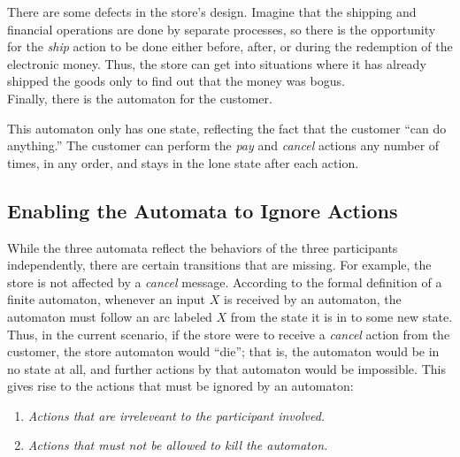 \documentclass[]{article}
\begin{document}
    There are some defects in the store's design. Imagine that the shipping
    and financial operations are done by separate processes, so there is the
    opportunity for the \emph{ship} action to be done either before, after, or
    during the redemption of the electronic money. Thus, the store can get
    into situations where it has already shipped the goods only to find out
    that the money was bogus. \\
    \indent Finally, there is the automaton for the customer.


    This automaton only has one state, reflecting the fact that the customer
    ``can do anything.'' The customer can perform the \emph{pay} and
    \emph{cancel} actions any number of times, in any order, and stays in the
    lone state after each action.

  \subsection*{Enabling the Automata to Ignore Actions}
    While the three automata reflect the behaviors of the three participants
    independently, there are certain transitions that are missing. For
    example, the store is not affected by a \emph{cancel} message. According
    to the formal definition of a finite automaton, whenever an input $X$ is
    received by an automaton, the automaton must follow an arc labeled $X$
    from the state it is in to some new state. \\
    \indent Thus, in the current scenario, if the store were to receive a
    \emph{cancel} action from the customer, the store automaton would ``die'';
    that is, the automaton would be in no state at all, and further actions by
    that automaton would be impossible. This gives rise to the actions that
    must be ignored by an automaton:
    \begin{enumerate}
      \item \emph{Actions that are irreleveant to the participant involved.}
      \item \emph{Actions that must not be allowed to kill the automaton.}
    \end{enumerate}
\end{document}
